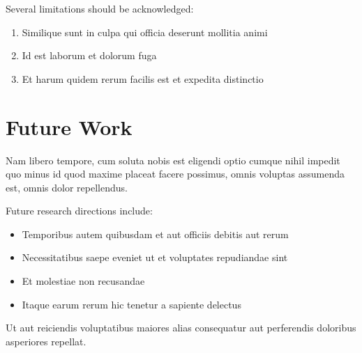 \documentclass[../main.tex]{subfiles}
\begin{document}
Several limitations should be acknowledged:
\begin{enumerate}
    \item Similique sunt in culpa qui officia deserunt mollitia animi
    \item Id est laborum et dolorum fuga
    \item Et harum quidem rerum facilis est et expedita distinctio
\end{enumerate}

\section{Future Work}

Nam libero tempore, cum soluta nobis est eligendi optio cumque nihil impedit quo minus id quod maxime placeat facere possimus, omnis voluptas assumenda est, omnis dolor repellendus.

Future research directions include:
\begin{itemize}
    \item Temporibus autem quibusdam et aut officiis debitis aut rerum
    \item Necessitatibus saepe eveniet ut et voluptates repudiandae sint
    \item Et molestiae non recusandae
    \item Itaque earum rerum hic tenetur a sapiente delectus
\end{itemize}

Ut aut reiciendis voluptatibus maiores alias consequatur aut perferendis doloribus asperiores repellat.
\end{document}
